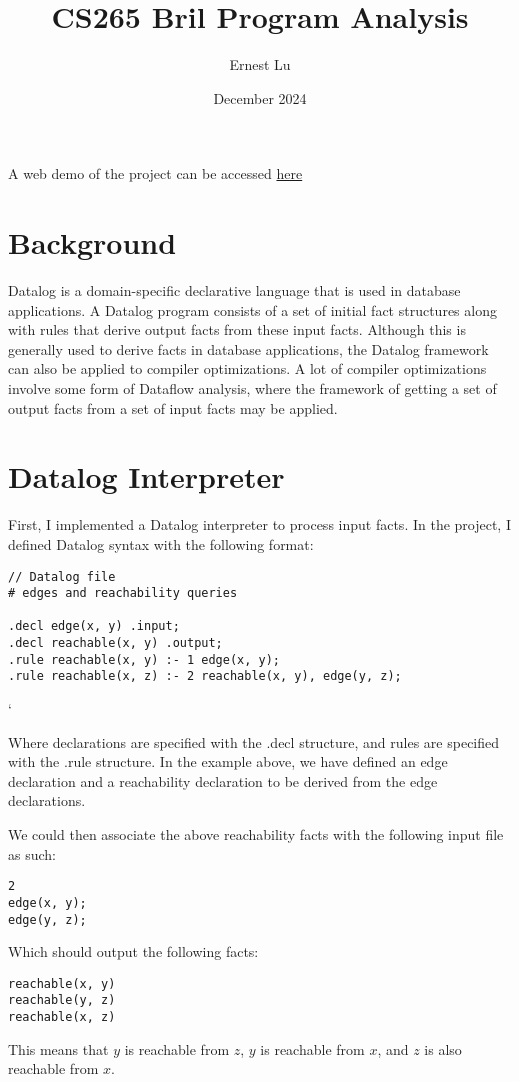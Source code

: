 \documentclass{article}
\title{CS265 Bril Program Analysis}
\author{Ernest Lu}
\date{December 2024}
\begin{document}
\maketitle

A web demo of the project can be accessed \href{https://ernest-lu.github.io/datalog-interpreter/}{here} 
\section{Background}
Datalog is a domain-specific declarative language that is used in database applications. A Datalog program consists of a set of initial fact structures along with rules that derive output facts from these input facts. Although this is generally used to derive facts in database applications, the Datalog framework can also be applied to compiler optimizations. A lot of compiler optimizations involve some form of Dataflow analysis, where the framework of getting a set of output facts from a set of input facts may be applied. 

\section{Datalog Interpreter}
First, I implemented a Datalog interpreter to process input facts.
In the project, I defined Datalog syntax with the following format:

\begin{lstlisting}
// Datalog file
# edges and reachability queries

.decl edge(x, y) .input;
.decl reachable(x, y) .output;
.rule reachable(x, y) :- 1 edge(x, y);
.rule reachable(x, z) :- 2 reachable(x, y), edge(y, z); 
\end{lstlisting}`

Where declarations are specified with the .decl structure, and rules are specified with the .rule structure. In the example above, we have defined an edge declaration and a reachability declaration to be derived from the edge declarations.

We could then associate the above reachability facts with the following input file as such:
\begin{lstlisting}
2
edge(x, y);
edge(y, z);
\end{lstlisting}
Which should output the following facts:
\begin{lstlisting}
reachable(x, y)
reachable(y, z)
reachable(x, z)
\end{lstlisting}
This means that $y$ is reachable from $z$, $y$ is reachable from $x$, and $z$ is also reachable from $x$.
\end{document}
